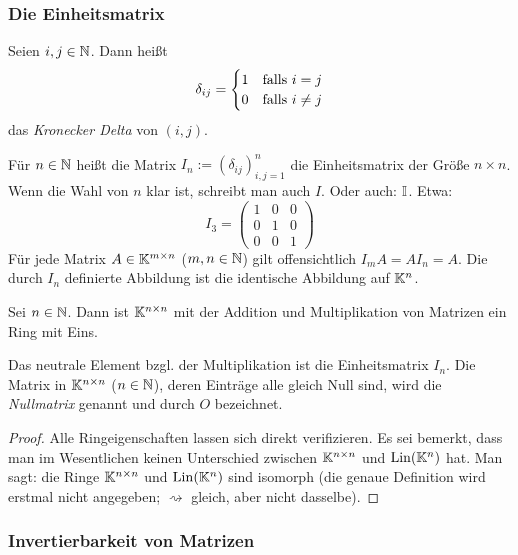 \subsubsection{Die Einheitsmatrix}

Seien $ i,j\in\mathbb N $. Dann heißt
\begin{equation}
	\delta_{ij} =
	\begin{cases}
		1 & \text{falls $ i = j $}\\
		0 & \text{falls $ i \neq j $}
	\end{cases}
\end{equation}
das \emph{Kronecker Delta} von $ (i,j) $.

Für $ n\in\mathbb N $ heißt die Matrix $ I_n := (\delta_{ij})_{i,j=1}^n $ die Einheitsmatrix der Größe $ n \times n $. Wenn die Wahl von $ n $ klar ist, schreibt man auch $ I $. Oder auch: $ \mathbb I $. Etwa:
\begin{equation}
	I_3 =
	\left( \begin{matrix}
	1 & 0 & 0 \\ 
	0 & 1 & 0 \\ 
	0 & 0 & 1
	\end{matrix}  \right)
\end{equation}
Für jede Matrix $ A\in\mathbb K^{m \times n} $ ($ m,n\in\mathbb N $) gilt offensichtlich $ I_mA = AI_n = A $. Die durch $ I_n $ definierte Abbildung ist die identische Abbildung auf $ \mathbb K^n $.

\begin{propn}
	Sei $ n\in\mathbb N $. Dann ist $ \mathbb K^{n \times n} $ mit der Addition und Multiplikation von Matrizen ein Ring mit Eins.
	
	Das neutrale Element bzgl. der Multiplikation ist die Einheitsmatrix $ I_n $. Die Matrix in $ \mathbb K^{n \times n} $ ($ n\in\mathbb N $), deren Einträge alle gleich Null sind, wird die \emph{Nullmatrix} genannt und durch $ O $ bezeichnet.
\end{propn}
\begin{proof}
	Alle Ringeigenschaften lassen sich direkt verifizieren. Es sei bemerkt, dass man im Wesentlichen keinen Unterschied zwischen $ \mathbb K^{n \times n} $ und $ \operatorname{Lin}(\mathbb K^n) $ hat. Man sagt: die Ringe $ \mathbb K^{n \times n} $ und $ \operatorname{Lin}(\mathbb K^n) $ sind isomorph (die genaue Definition wird erstmal nicht angegeben; $ \rightsquigarrow $ gleich, aber nicht dasselbe).
\end{proof}

\subsubsection{Invertierbarkeit von Matrizen}

